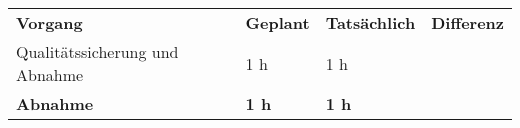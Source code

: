 \begin{tabular}{llll}
\rowcolor{heading}\textbf{Vorgang} & \textbf{Geplant} & \textbf{Tatsächlich} & \textbf{Differenz} \\
Qualitätssicherung und Abnahme & 1 h & 1 h   &  \\
\hline
\hline
\rowcolor{heading}\textbf{Abnahme} & \textbf{1 h} & \textbf{1 h} & \textbf{} \\
\end{tabular}
